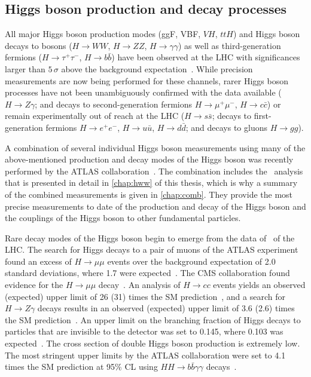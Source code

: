 \subsection{Higgs boson production and decay processes}
All major Higgs boson production modes (ggF, VBF, $VH$, $ttH$) and Higgs boson decays to bosons ($H \to WW$, $H \to ZZ$, $H \to \gamma\gamma$) as well as third-generation fermions ($H \to \tau^+\tau^-$, $H \to b\bar{b}$) have been observed at the LHC with significances larger than $5\,\sigma$ above the background expectation~\cite{NaturePaper}.
While precision measurements are now being performed for these channels, rarer Higgs boson processes have not been unambiguously confirmed with the data available ($H \to Z\gamma$; and decays to second-generation fermions $H \to \mu^+\mu^-$, $H \to c\bar{c}$) or remain experimentally out of reach at the LHC ($H \to s\bar{s}$; decays to first-generation fermions $H \to e^+e^-$, $H \to u\bar{u}$, $H \to d\bar{d}$; and decays to gluons $H \to gg$).

A combination of several individual Higgs boson measurements using many of the above-mentioned production and decay modes of the Higgs boson was recently performed by the ATLAS collaboration~\cite{NaturePaper}. 
The combination includes the \HWW\ analysis that is presented in detail in \cref{chap:hww} of this thesis, which is why a summary of the combined measurements is given in \cref{chap:comb}. 
They provide the most precise measurements to date of the production and decay of the Higgs boson and the couplings of the Higgs boson to other fundamental particles. 

Rare decay modes of the Higgs boson begin to emerge from the data of \RunTwo\ of the LHC. 
The search for Higgs decays to a pair of muons of the ATLAS experiment found an excess of $H \to \mu\mu$ events over the background expectation of 2.0 standard deviations, where 1.7 were expected~\cite{HIGG-2019-14}.
The CMS collaboration found evidence for the $H \to \mu\mu$ decay~\cite{CMSHmumuevidence}.
An analysis of $H \to cc$ events yields an observed (expected) upper limit of 26 (31) times the SM prediction~\cite{ATLAS-CONF-2021-021}, and a search for $H \to Z\gamma$ decays results in an observed (expected) upper limit of 3.6 (2.6) times the SM prediction~\cite{HIGG-2018-42}.
An upper limit on the branching fraction of Higgs decays to particles that are invisible to the detector was set to 0.145, where 0.103 was expected~\cite{ATLASInvisible1}.
The cross section of double Higgs boson production is extremely low. The most stringent upper limits by the ATLAS collaboration were set to 4.1 times the SM prediction at 95\% CL using $HH \to b\bar{b}\gamma\gamma$ decays~\cite{ATLAS-CONF-2021-016}.

